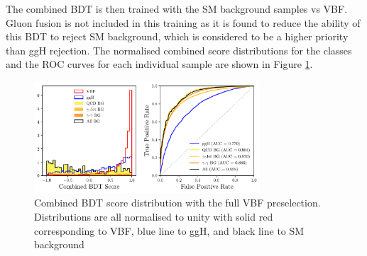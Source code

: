 The combined BDT is then trained with the SM background samples vs VBF. Gluon fusion is not included in this training as it is found to reduce the ability of this BDT to reject SM background, which is considered to be a higher priority than ggH rejection. 
The normalised combined score distributions for the classes and the ROC curves for each individual sample are shown in Figure \ref{fig:event_categorisaton:combined_bdt_performance}.
\begin{figure}[h!]
    \begin{center}
        \includegraphics[width=0.75\textwidth]{figures/event_selection/combined_BDT_PS.pdf}
    \end{center}
    \caption{Combined BDT score distribution with the full VBF preselection. Distributions are all normalised to unity with solid red corresponding to VBF, blue line to ggH, and black line to SM background}
    \label{fig:event_categorisaton:combined_bdt_performance}
\end{figure}



